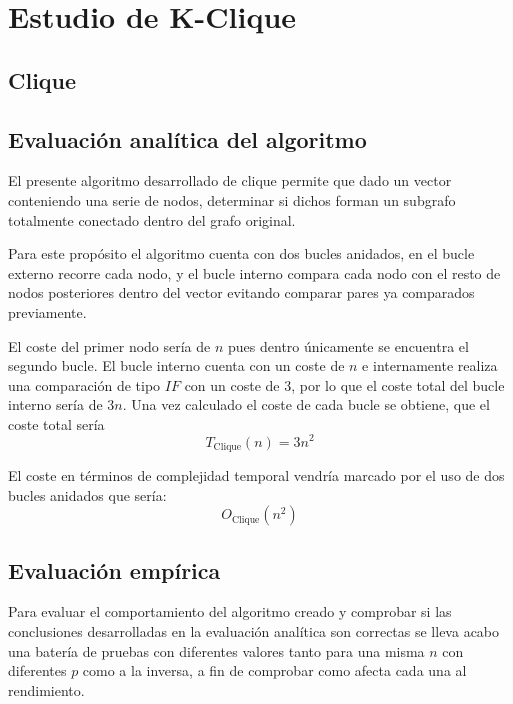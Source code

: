 \section{Estudio de K-Clique}\label{sec:clique}

\subsection{Clique}\label{subsec:clique}

\subsection*{Evaluación analítica del algoritmo}

 El presente algoritmo desarrollado de clique permite que dado un vector conteniendo una serie de nodos, determinar si dichos forman un subgrafo totalmente conectado dentro del grafo original.

 Para este propósito el algoritmo cuenta con dos bucles anidados, en el bucle externo recorre cada nodo, y el bucle interno compara cada nodo con el resto de nodos posteriores dentro del vector evitando comparar pares ya comparados previamente.
 
 El coste del primer nodo sería de $n$ pues dentro únicamente se encuentra el segundo bucle. 
 El bucle interno cuenta con un coste de $n$ e internamente realiza una comparación de tipo $IF$ con un coste de 3, por lo que el coste total del bucle interno sería de $3n$.
 Una vez calculado el coste de cada bucle se obtiene, que el coste total sería 
\begin{equation}
    T_{\mathrm{Clique}}(n) = 3n^2
\end{equation}

El coste en términos de complejidad temporal vendría marcado por el uso de dos bucles anidados que sería: 
\begin{equation}
    O_{\mathrm{Clique}}(n^2) 
\end{equation}


\subsection*{Evaluación empírica}

Para evaluar el comportamiento del algoritmo creado y comprobar si las conclusiones desarrolladas en la evaluación analítica son correctas se lleva acabo una batería de pruebas con diferentes valores tanto para una misma $n$ con diferentes $p$ como a la inversa, a fin de comprobar como afecta cada una al rendimiento.

